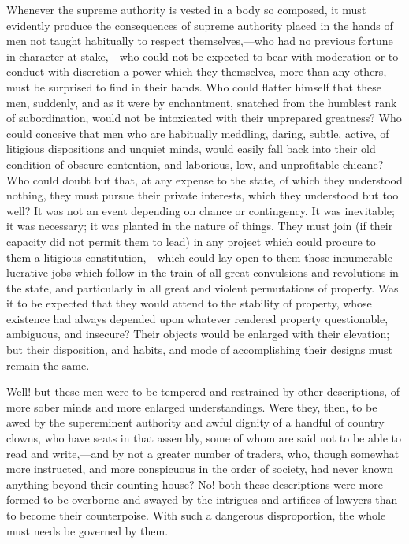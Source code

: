Whenever the supreme authority is vested in a body so composed, it must evidently produce the consequences of supreme authority placed in the hands of men not taught habitually to respect themselves,—who had no previous fortune in character at stake,—who could not be expected to bear with moderation or to conduct with discretion a power which they themselves, more than any others, must be surprised to find in their hands. Who could flatter himself that these men, suddenly, and as it were by enchantment, snatched from the humblest rank of subordination, would not be intoxicated with their unprepared greatness? Who could conceive that men who are habitually meddling, daring, subtle, active, of litigious dispositions and unquiet minds, would easily fall back into their old condition of obscure contention, and laborious, low, and unprofitable chicane? Who could doubt but that, at any expense to the state, of which they understood nothing, they must pursue their private interests, which they understood but too well? It was not an event depending on chance or contingency. It was inevitable; it was necessary; it was planted in the nature of things. They must join (if their capacity did not permit them to lead) in any project which could procure to them a litigious constitution,—which could lay open to them those innumerable lucrative jobs which follow in the train of all great convulsions and revolutions in the state, and particularly in all great and violent permutations of property. Was it to be expected that they would attend to the stability of property, whose existence had always depended upon whatever rendered property questionable, ambiguous, and insecure? Their objects would be enlarged with their elevation; but their disposition, and habits, and mode of accomplishing their designs must remain the same.

Well! but these men were to be tempered and restrained by other descriptions, of more sober minds and more enlarged understandings. Were they, then, to be awed by the supereminent authority and awful dignity of a handful of country clowns, who have seats in that assembly, some of whom are said not to be able to read and write,—and by not a greater number of traders, who, though somewhat more instructed, and more conspicuous in the order of society, had never known anything beyond their counting-house? No! both these descriptions were more formed to be overborne and swayed by the intrigues and artifices of lawyers than to become their counterpoise. With such a dangerous disproportion, the whole must needs be governed by them.

